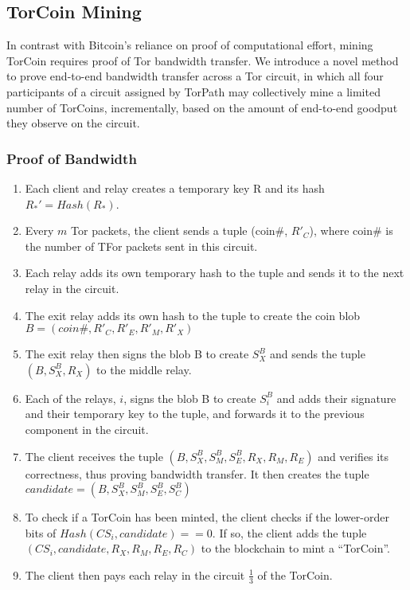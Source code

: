 \subsection{TorCoin Mining}

In contrast with Bitcoin's reliance on proof of computational effort,
mining TorCoin requires proof of Tor bandwidth transfer.
We introduce a novel method to
prove end-to-end bandwidth transfer across a Tor circuit,
in which all four participants of a circuit assigned by TorPath
may collectively mine a limited number of TorCoins, incrementally,
based on the amount of end-to-end goodput they observe on the circuit.



\subsubsection{Proof of Bandwidth}
\begin{enumerate}
\item
Each client and relay creates a temporary key R and its hash $R_*' = Hash(R_*)$. 

\item
Every $m$ Tor packets, the client sends a tuple (coin\#, $R'_C$), where 
coin\# is the number of TFor packets sent in this circuit.

\item
Each relay adds its own temporary hash to the tuple and sends it to the next
relay in the circuit.

\item
The exit relay adds its own hash to the tuple to create the coin blob 
$B = (coin\#, R'_{C}, R'_{E}, R'_{M}, R'_{X})$ 

\item
The exit relay then signs the blob B to create $S^B_X$ and sends the 
tuple $(B, S^B_X, R_X)$ to the middle relay.

\item
Each of the relays, $i$, signs the blob B to create $S^B_i$ and adds their 
signature and their temporary key to the tuple, and forwards it to the previous 
component in the circuit. 

\item
The client receives the tuple $(B, S^B_X, S^B_M, S^B_E, R_X, R_M,
R_E)$ and verifies its correctness, thus proving bandwidth transfer. It then
creates the tuple $candidate = (B, S^B_X, S^B_M, S^B_E, S^B_C)$

\item
To check if a TorCoin has been minted, the client checks if the lower-order
bits of $Hash(CS_i, candidate) == 0$. If so, the client adds the tuple
$(CS_i, candidate, R_X, R_M, R_E, R_C)$ to the blockchain to mint a ``TorCoin''.

\item
The client then pays each relay in the circuit $\frac{1}{3}$ of the TorCoin. 
\end{enumerate}

